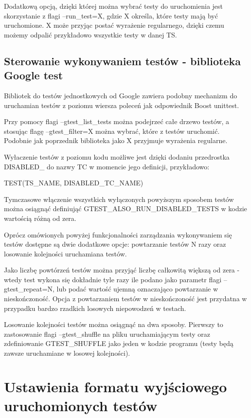 \documentclass[12pt,a4paper,notitlepage]{report}
\begin{document}
Dodatkową opcją, dzięki której można wybrać testy do uruchomienia jest skorzystanie z flagi --run{\_}test=X, gdzie X określa, które testy mają być uruchomione. X może przyjąc postać wyrażenie regularnego, dzięki czemu możemy odpalić przykładowo wszystkie testy w danej TS.

\section{Sterowanie wykonywaniem testów - biblioteka Google test}

Bibliotek do testów jednostkowych od Google zawiera podobny mechanizm do uruchamian testów z poziomu wiersza poleceń jak odpowiednik Boost unittest.

Przy pomocy flagi --gtest{\_}list{\_}tests można podejrzeć całe drzewo testów, a stosując flagę --gtest{\_}filter=X można wybrać, które z testów uruchomić. Podobnie jak poprzednik biblioteka jako X przyjmuje wyrażenia regularne.

Wyłaczenie testów z poziomu kodu możliwe jest dzięki dodaniu przedrostka DISABLED{\_} do nazwy TC w momencie jego definicji, przykładowo:

TEST(TS{\_}NAME, DISABLED{\_}TC{\_}NAME)

Tymczasowe włączenie wszystkich wyłączonych powyższym sposobem testów można osiągnąć definiująć GTEST{\_}ALSO{\_}RUN{\_}DISABLED{\_}TESTS w kodzie wartością różną od zera.

Oprócz omówionych powyżej funkcjonalności zarządzania wykonywaniem się testów dostępne są dwie dodatkowe opcje: powtarzanie testów N razy oraz losowanie kolejności uruchamiana testów.

Jako liczbę powtórzeń testów można przyjąć liczbę całkowitą większą od zera - wtedy test wykona się dokładnie tyle razy ile podano jako parametr flagi --gtest{\_}repeat=N, lub podać wartość ujemną oznaczająco powtarzanie w nieskończoność. Opcja z powtarzaniem testów w nieskończoność jest przydatna w przypadku bardzo rzadkich losowych niepowodzeń w testach.

Losowanie kolejności testów można osiągnąć na dwa sposoby. Pierwszy to zastosowanie flagi --gtest{\_}shuffle na pliku uruchamiającym testy oraz zdefiniowanie GTEST{\_}SHUFFLE jako jeden w kodzie programu (testy będą zawsze uruchamiane w losowej kolejności).

\chapter{Ustawienia formatu wyjściowego uruchomionych testów}
\end{document}
